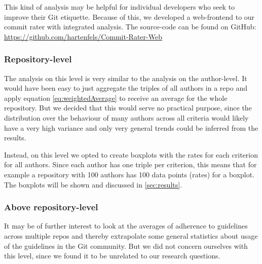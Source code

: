 This kind of analysis may be helpful for individual developers who seek to improve their Git etiquette. Because of this, we developed a web-frontend to our commit rater with integrated analysis. The source-code can be found on GitHub: \url{https://github.com/hartenfels/Commit-Rater-Web}


\subsubsection{Repository-level}
The analysis on this level is very similar to the analysis on the author-level. It would have been easy to just aggregate the triples of all authors in a repo and apply equation \ref{eq:weightedAverage} to receive an average for the whole repository. But we decided that this would serve no practical purpose, since the distribution over the behaviour of many authors across all criteria would likely have a very high variance and only very general trends could be inferred from the results.

Instead, on this level we opted to create boxplots with the rates for each criterion for all authors. Since each author has one triple per criterion, this means that for example a repository with 100 authors has 100 data points (rates) for a boxplot. The boxplots will be shown and discussed in \ref{sec:results}.

\subsubsection{Above repository-level}
It may be of further interest to look at the averages of adherence to guidelines across multiple repos and thereby extrapolate some general statistics about usage of the guidelines in the Git community. But we did not concern ourselves with this level, since we found it to be unrelated to our research questions.
